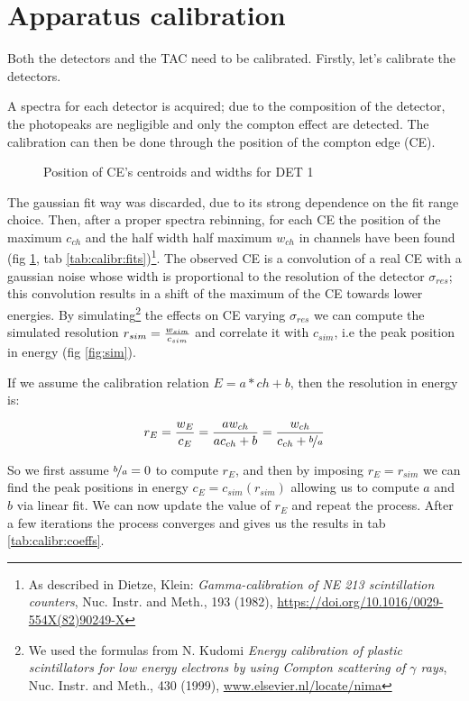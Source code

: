 \documentclass[11pt,a4 paper]{article}
\let\oldfrac\frac
\renewcommand{\frac}[3][d]{\ifthenelse{\equal{#1}{d}}{\oldfrac{#2}{#3}}{\nicefrac{#2}{#3}}}
\begin{document}
\section{Apparatus calibration}
Both the detectors and the TAC need to be calibrated. Firstly, let's calibrate the detectors.

A spectra for each detector is acquired; due to the composition of the detector, the photopeaks are negligible and only the compton effect are detected. The calibration can then be done through the position of the compton edge (CE).

\begin{figure}[H]
    \centering
    \caption{Position of CE's centroids and widths for DET 1}
    \label{fig:det1:calibr}
\end{figure}

The gaussian fit way was discarded, due to its strong dependence on the fit range choice. Then, after a proper spectra rebinning, for each CE the position of the maximum $c_{ch}$ and the half width half maximum $w_{ch}$ in channels have been found (fig \ref{fig:det1:calibr}, tab \ref{tab:calibr:fits})\footnote{As described in Dietze, Klein: \emph{Gamma-calibration of NE 213 scintillation counters}, Nuc. Instr. and Meth., 193 (1982), \url{https://doi.org/10.1016/0029-554X(82)90249-X}}.
The observed CE is a convolution of a real CE with a gaussian noise whose width is proportional to the resolution of the detector $\sigma_{res}$; this convolution results in a shift of the maximum of the CE towards lower energies. By simulating\footnote{We used the formulas from N. Kudomi \emph{Energy calibration of plastic scintillators for low energy electrons by using Compton scattering of $\gamma$ rays}, Nuc. Instr. and Meth., 430 (1999), \url{www.elsevier.nl/locate/nima}} the effects on CE varying $\sigma_{res}$ we can compute the simulated resolution $r_{sim} = \frac{w_{sim}}{c_{sim}}$ and correlate it with $c_{sim}$, i.e the peak position in energy (fig \ref{fig:sim}).

If we assume the calibration relation $E = a*ch + b$, then the resolution in energy is:

\begin{equation*}
  r_E = \frac{w_E}{c_E} = \frac{a w_{ch}}{a c_{ch} + b} = \frac{w_{ch}}{c_{ch} + \frac[f]{b}{a}}
\end{equation*}

So we first assume $\frac[f]{b}{a} = 0$ to compute $r_E$, and then by imposing $r_E = r_{sim}$ we can find the peak positions in energy $c_E = c_{sim}(r_{sim})$ allowing us to compute $a$ and $b$ via linear fit. We can now update the value of $r_E$ and repeat the process. After a few iterations the process converges and gives us the results in tab \ref{tab:calibr:coeffs}.
\end{document}
